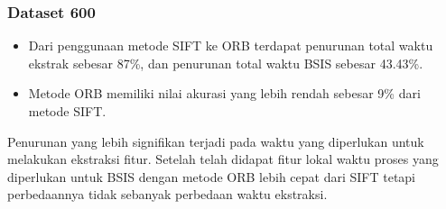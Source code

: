 \subsubsection{Dataset 600}
\begin{itemize}
	\item Dari penggunaan metode SIFT ke ORB terdapat penurunan total waktu ekstrak sebesar 87\%, dan penurunan total waktu BSIS sebesar 43.43\%.
	\item Metode ORB memiliki nilai akurasi yang lebih rendah sebesar 9\% dari metode SIFT.
\end{itemize} 
Penurunan yang lebih signifikan terjadi pada waktu yang diperlukan untuk melakukan ekstraksi fitur. Setelah telah didapat fitur lokal waktu proses yang diperlukan untuk BSIS dengan metode ORB lebih cepat dari SIFT tetapi perbedaannya tidak sebanyak perbedaan waktu ekstraksi. 

